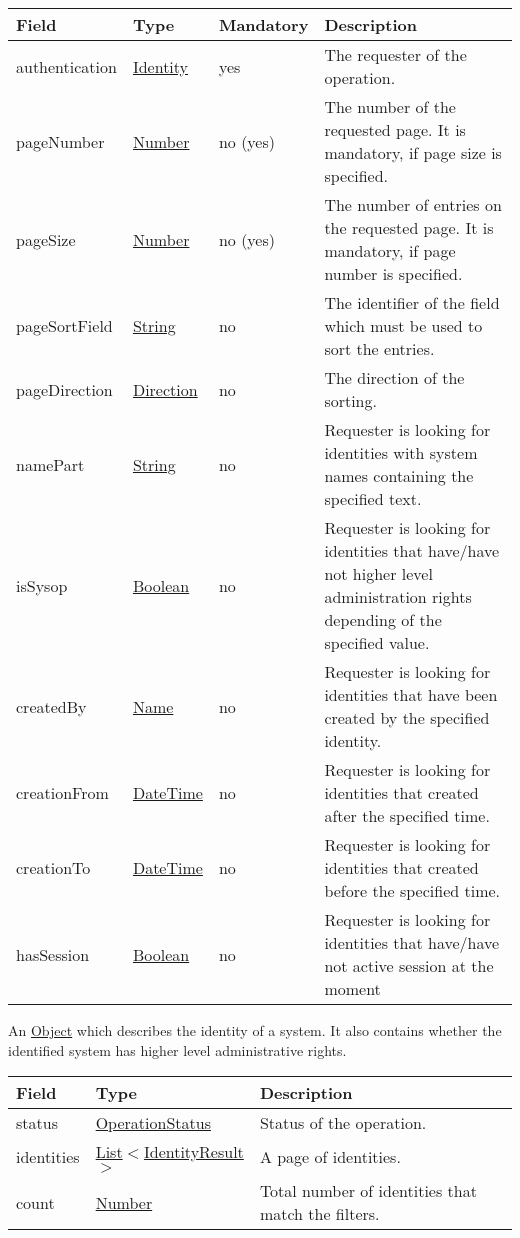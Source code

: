 \documentclass[a4paper]{arrowhead}
\newcommand{\pref}[1]{{\textcolor{ArrowheadGrey}{\hyperref[sec:model:primitives:#1]{#1}}}}
\begin{document}
\begin{table}[ht!]
\begin{tabularx}{\textwidth}{| p{4.3cm} | p{4.8cm} | p{2cm} | X |} \hline
\rowcolor{gray!33} Field & Type & Mandatory & Description \\ \hline
authentication & \hyperref[sec:model:Identity]{Identity} & yes & The requester of the operation. \\ \hline
pageNumber & \pref{Number} & no (yes) & The number of the requested page. It is mandatory, if page size is specified. \\ \hline
pageSize & \pref{Number} & no (yes) & The number of entries on the requested page. It is mandatory, if page number is specified. \\ \hline
pageSortField & \pref{String} & no & The identifier of the field which must be used to sort the entries. \\ \hline
pageDirection & \pref{Direction} & no & The direction of the sorting. \\ \hline
namePart &  \pref{String} & no & Requester is looking for identities with system names containing the specified text. \\ \hline
isSysop & \pref{Boolean} & no & Requester is looking for identities that have/have not higher level administration rights depending of the specified value. \\ \hline
createdBy & \pref{Name} & no & Requester is looking for identities that have been created by the specified identity. \\ \hline
creationFrom &  \pref{DateTime} & no & Requester is looking for identities that created after the specified time. \\ \hline
creationTo &  \pref{DateTime} & no & Requester is looking for identities that created before the specified time. \\ \hline
hasSession & \pref{Boolean} & no & Requester is looking for identities that have/have not active session at the moment \\ \hline
\end{tabularx}
\end{table}


An \pref{Object} which describes the identity of a system. It also contains whether the identified system has higher level administrative rights.


\begin{table}[ht!]
\begin{tabularx}{\textwidth}{| p{2.5cm} | p{3.2cm} | X |} \hline
\rowcolor{gray!33} Field & Type      & Description \\ \hline
status & \pref{OperationStatus} & Status of the operation. \\ \hline
identities & \pref{List}$<$\hyperref[sec:model:IdentityResult]{IdentityResult}$>$ & A page of identities. \\ \hline
count & \pref{Number} & Total number of identities that match the filters. \\ \hline
\end{tabularx}
\end{table}
\end{document}
